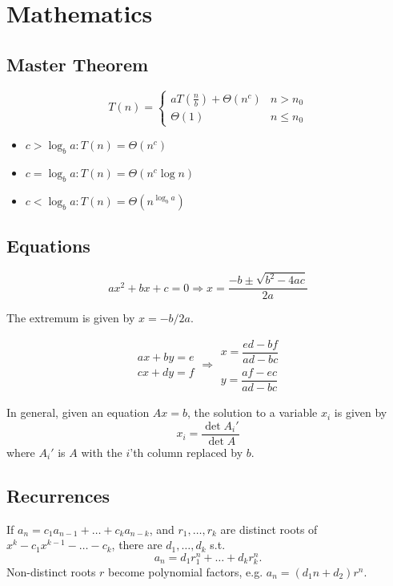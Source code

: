 
\chapter{Mathematics}

\section{Master Theorem}
\begin{equation*}
    T(n) = 
        \begin{cases}
            aT(\frac{n}{b}) + \Theta(n^c) & n > n_0\\
            \Theta(1) & n \leq n_0
        \end{cases}
\end{equation*}

\begin{itemize}
  \item $c > \log_ba : T(n) = \Theta(n^c)$
  \item $c = \log_ba : T(n) = \Theta(n^c\log n)$
  \item $c < \log_ba : T(n) = \Theta(n^{\log_ba})$
\end{itemize}

\section{Equations}
\[ax^2+bx+c=0 \Rightarrow x = \frac{-b\pm\sqrt{b^2-4ac}}{2a}\]

The extremum is given by $x = -b/2a$.

\[\begin{aligned}ax+by=e\\cx+dy=f\end{aligned}
\Rightarrow
\begin{aligned}x=\dfrac{ed-bf}{ad-bc}\\y=\dfrac{af-ec}{ad-bc}\end{aligned}\]

In general, given an equation $Ax = b$, the solution to a variable $x_i$ is given by
\[x_i = \frac{\det A_i'}{\det A} \]
where $A_i'$ is $A$ with the $i$'th column replaced by $b$.

\section{Recurrences}
If $a_n = c_1 a_{n-1} + \dots + c_k a_{n-k}$, and $r_1, \dots, r_k$ are distinct roots of $x^k - c_1 x^{k-1} - \dots - c_k$, there are $d_1, \dots, d_k$ s.t.
\[a_n = d_1r_1^n + \dots + d_kr_k^n. \]
Non-distinct roots $r$ become polynomial factors, e.g. $a_n = (d_1n + d_2)r^n$.

